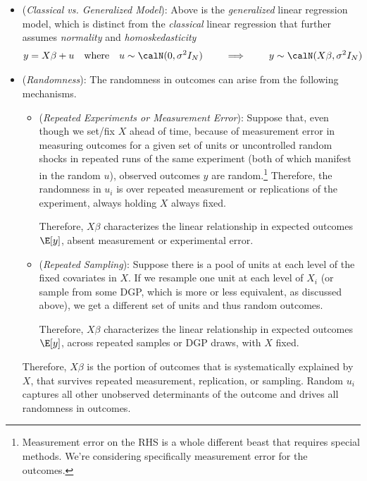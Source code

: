 \documentclass[12pt]{article}
\theoremstyle{plain}
\theoremstyle{definition}
\theoremstyle{remark}
\begin{document}
\begin{itemize}
  \item (\emph{Classical vs. Generalized Model}):
    Above is the \emph{generalized} linear regression model, which is
    distinct from the \emph{classical} linear regression that further
    assumes \emph{normality} and \emph{homoskedasticity}
    \begin{align*}
      y=X\beta+u
      \quad\text{where}\quad
      u\sim\calN(0,\sigma^2I_N)
      \qquad\implies\qquad
      y\sim \calN(X\beta,\sigma^2 I_N)
    \end{align*}


  \item (\emph{Randomness}):
    The randomness in outcomes can arise from the following mechanisms.
    \begin{itemize}
      \item (\emph{Repeated Experiments or Measurement Error}):
        Suppose that, even though we set/fix $X$ ahead of time, because
        of measurement error in measuring outcomes for a given set of
        units or uncontrolled random shocks in repeated runs of the same
        experiment (both of which manifest in the random $u$), observed
        outcomes $y$ are random.\footnote{%
          Measurement error on the RHS is a whole different beast that
          requires special methods.
          We're considering specifically measurement error for the
          outcomes.
        }
        Therefore, the randomness in $u_i$ is over repeated measurement
        or replications of the experiment, always holding $X$ always
        fixed.

        Therefore, $X\beta$ characterizes the linear relationship in
        expected outcomes $\E[y]$,
        absent measurement or experimental error.

      \item (\emph{Repeated Sampling}):
        Suppose there is a pool of units at each level of the fixed
        covariates in $X$.
        If we resample one unit at each level of $X_i$ (or sample from
        some DGP, which is more or less equivalent, as discussed above),
        we get a different set of units and thus random outcomes.

        Therefore, $X\beta$ characterizes the linear relationship in
        expected outcomes $\E[y]$,
        across repeated samples or DGP draws, with $X$ fixed.
    \end{itemize}
    Therefore, $X\beta$ is the portion of outcomes that is
    systematically explained by $X$, that survives repeated measurement,
    replication, or sampling.
    Random $u_i$ captures all other unobserved determinants of the
    outcome and drives all randomness in outcomes.


\end{itemize}
\end{document}
